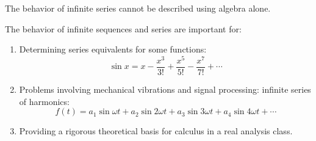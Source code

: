 \documentclass[letterpaper,12pt,fleqn]{article}
\newcommand{\w}{\omega}
\begin{document}
The behavior of infinite series cannot be described using algebra alone.

The behavior of infinite sequences and series are important for:
\begin{enumerate}
\item Determining series equivalents for some functions:
  \[\sin x=x-\frac{x^3}{3!}+\frac{x^5}{5!}-\frac{x^7}{7!}+\cdots\]
\item Problems involving mechanical vibrations and signal processing: infinite series of harmonics:
  \[f(t)=a_1\sin\w t+a_2\sin2\w t+a_3\sin3\w t+a_4\sin4\w t+\cdots\]
\item Providing a rigorous theoretical basis for calculus in a real analysis class.
\end{enumerate}
\end{document}
